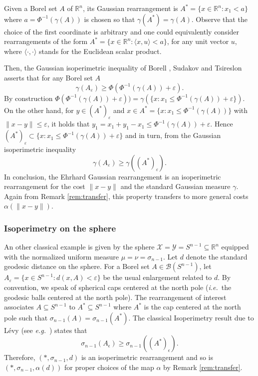 \documentclass[11pt]{article}
\newcommand{\1}{[1]}
\begin{document}
Given a Borel set $A$ of $\mathbb{R}^n$, its Gaussian rearrangement is 
$A^*=\{x \in \mathbb{R}^n : x_1 < a\}$
where $a=\Phi^{-1}(\gamma(A))$ is chosen so that $\gamma(A^*)=\gamma(A)$.
Observe that the choice of the first coordinate is arbitrary and one could equivalently consider rearrangements of the form 
$A^*=\{x \in \mathbb{R}^n : \langle x , u \rangle < a\}$, for any unit vector $u$, where $\langle\cdot,\cdot \rangle$ stands for the Euclidean scalar product.

Then, the Gaussian isoperimetric inequality of Borell \cite{borell}, Sudakov and Tsireslon \cite{sudakov}
asserts that for any Borel set $A$
$$
\gamma(A_\varepsilon) \geq \Phi( \Phi^{-1}(\gamma(A)) + \varepsilon).
$$
By construction 
$\Phi( \Phi^{-1}(\gamma(A)) + \varepsilon)) = \gamma(\{x : x_1 \leq \Phi^{-1}(\gamma(A)) + \varepsilon\})$.
On the other hand, 
for $y \in (A^*)_\varepsilon$ and 
$x \in A^*=\{x: x_1 \leq \Phi^{-1}(\gamma(A))\}$ with $\|x-y\| \leq \varepsilon$, it holds that
$y_1=x_1+y_1-x_1 \leq \Phi^{-1}(\gamma(A)) + \varepsilon$. Hence 
$(A^*)_\varepsilon \subset \{x : x_1 \leq \Phi^{-1}(\gamma(A)) + \varepsilon\}$ and in turn, from the Gaussian isoperimetric inequality
$$
\gamma(A_\varepsilon) \geq \gamma((A^*)_\varepsilon).
$$
In conclusion, the Ehrhard Gaussian rearrangement is an isoperimetric rearrangement for the cost $\|x-y\|$ and the standard Gaussian measure $\gamma$. 
Again from Remark \ref{rem:transfer}, this property transfers to more general costs $\alpha(\|x-y\|)$.


\subsubsection*{Isoperimetry on the sphere}
An other classical example is given by the sphere $\mathcal{X}=\mathcal{Y}=S^{n-1}\subseteq\mathbb{R}^{n}$ equipped with the normalized uniform measure $\mu=\nu=\sigma_{n-1}$. Let $d$ denote the standard geodesic distance on the sphere. For a Borel set $A\in\mathcal{B}(S^{n-1})$, let $A_{\varepsilon}=\{x\in S^{n-1}:d(x,A)<\varepsilon\}$ be the usual enlargement related to $d$. 
By convention, we speak of spherical caps centered at the north pole (\textit{i.e.}\ the geodesic balls centered at the north pole). The rearrangement of interest associates $A\subseteq S^{n-1}$ to $A^*\subseteq S^{n-1}$ where $A^*$ is the cap centered at the north pole such that $\sigma_{n-1}(A)=\sigma_{n-1}(A^*)$.
The classical Isoperimetry result due to Lévy (see \textit{e.g.}\ \cite{ledoux}) states that 
$$
\sigma_{n-1}(A_\epsilon)\geq\sigma_{n-1}((A^*)_{\epsilon}) .
$$ 
Therefore, $(*,\sigma_{n-1},d)$ is an isoperimetric rearrangement and so is  
$(*,\sigma_{n-1},\alpha(d))$ for proper choices of the map $\alpha$ by Remark \ref{rem:transfer}.
\end{document}
